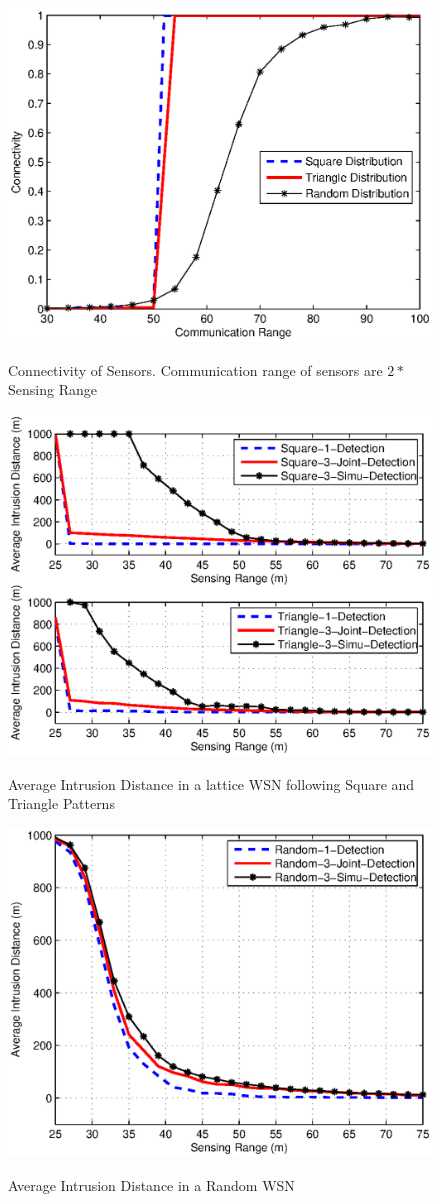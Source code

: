 \documentclass[10pt, conference, compsocconf, twocolumn]{IEEEtran}
\begin{document}
\begin{figure} [b]
  \includegraphics[width=3.2 in]{connectivitySquareTriangleRandom.eps}\\
  \caption{Connectivity of Sensors.  Communication range of sensors are $2 *$ Sensing Range}\label{connectivitySquareTriangleRandom.eps}
\end{figure}



\begin{figure}
\centering
  \includegraphics[width= 3.2 in]{AveIntruDistance_SquareTriangle.eps}\\
  \caption{Average Intrusion Distance in a lattice WSN following Square and Triangle Patterns}\label{AveIntruDistance_SquareTriangle.eps}
\end{figure}

\begin{figure}
\centering
  \includegraphics[width= 3.2 in]{AveIntruDistance_Random.eps}\\
  \caption{Average Intrusion Distance in a Random WSN}\label{AveIntruDistance_Random.eps}
\end{figure}
\end{document}
